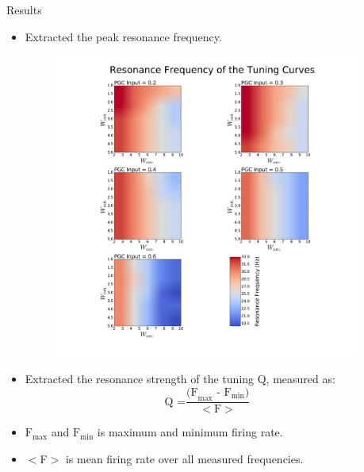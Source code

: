 \documentclass[final,hyperref={pdfpagelabels=false}]{beamer}
\begin{document}
\begin{frame}{}
\begin{columns}[t]
\begin{column}{.48\linewidth}
\end{column}
\begin{column}{.48\linewidth}

\begin{block}{Results}
\begin{itemize}
\item Extracted the peak resonance frequency.
\begin{figure}
\center
\includegraphics[scale=0.55]{images/Contour_plot_tuning_frequency}
\end{figure}
\item Extracted the resonance strength of the tuning Q, measured as:
\[
\text{Q =} \frac{\text{(F}_{\text{max}} \text{ - F}_{\text{min}}\text{)}}{<\text{F}>}
\]
\item \mbox{$\text{F}_{\text{max}}$} and \mbox{$\text{F}_{\text{min}}$} is maximum and minimum firing rate.
\item $<$F$>$ is mean firing rate over all measured frequencies.
\end{itemize}
\begin{figure}
\center

\end{figure}
\end{block}
\end{column}
\end{columns}
\end{frame}
\end{document}
